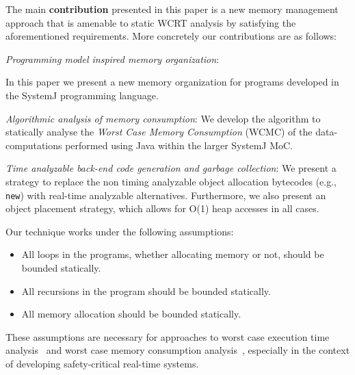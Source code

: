 
The main \textbf{contribution} presented in this paper is a new memory
management approach that is amenable to static WCRT analysis by
satisfying the aforementioned requirements. More concretely our
contributions are as follows:

\begin{itemize}
\item \textit{Programming model inspired memory organization}:
  {\color{red} In this paper we present a new memory organization for
    programs developed in the SystemJ programming language. %
    
  \item \textit{Algorithmic analysis of memory consumption}: We develop
    the algorithm to statically analyse the \textit{Worst Case Memory
      Consumption} (WCMC) of the data-computations performed using Java
    within the larger SystemJ MoC.

  }
\item \textit{Time analyzable back-end code generation and garbage
    collection}: We present a strategy to replace the non timing
  analyzable object allocation bytecodes (e.g., \texttt{new}) with
  real-time analyzable alternatives. Furthermore, we also present an
  object placement strategy, which allows for O(1) heap accesses in all
  cases.
\end{itemize}

{\color{black}
  
  Our technique works under the following assumptions:
  \begin{itemize}
  \item All loops in the programs, whether allocating memory or not,
    should be bounded statically.
  \item All recursions in the program should be bounded statically.
  \item All memory allocation should be bounded statically.
  \end{itemize}
  
  These assumptions are necessary for approaches to worst case execution
  time analysis~\cite{jop:wcet:jtres06} and worst case memory
  consumption analysis~\cite{andersen2013worst}, {\color{red} especially
    in the context of developing safety-critical real-time systems.}

}


